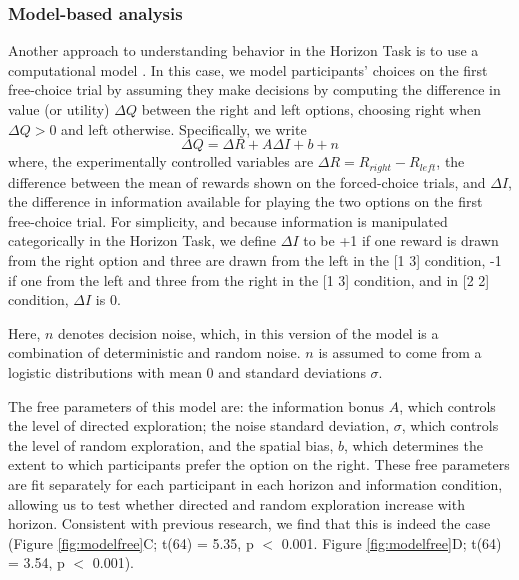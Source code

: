 \documentclass[12pt]{article}
\begin{document}
{	\subsubsection*{Model-based analysis}	
	Another approach to understanding behavior in the Horizon Task is to use a computational model \citep{wilson2014}. In this case, we model  participants' choices on the first free-choice trial by assuming they make decisions by computing the difference in value (or utility) $\Delta Q$ between the right and left options, choosing right when $\Delta Q > 0$ and left otherwise.  Specifically, we write
	\begin{equation}
		\label{eq:origmodel}
		\Delta Q= \Delta R+A \Delta I+b+n
	\end{equation}
	where, the experimentally controlled variables are $\Delta R=R_{right}-R_{left}$, the difference between the mean of rewards shown on the forced-choice trials, and $\Delta I$, the difference in information available for playing the two options on the first free-choice trial. For simplicity, and because information is manipulated categorically in the Horizon Task, we define $\Delta I$ to be +1 if one reward is drawn from the right option and three are drawn from the left in the [1 3] condition, -1 if one from the left and three from the right in the [1 3] condition, and in [2 2] condition, $\Delta I$ is 0. 
	
	Here, $n$ denotes decision noise, which, in this version of the model is a combination of deterministic and random noise. $n$ is assumed to come from a logistic distributions with mean 0 and standard deviations $\sigma$.
	
	The free parameters of this model are: the information bonus $A$, which controls the level of directed exploration; the noise standard deviation, $\sigma$, which controls the level of random exploration, and the spatial bias, $b$, which determines the extent to which participants prefer the option on the right. These free parameters are fit separately for each participant in each horizon and information condition, allowing us to test whether directed and random exploration increase with horizon. Consistent with previous research, we find that this is indeed the case (Figure \ref{fig:modelfree}C; t(64) = 5.35, p $<$ 0.001. Figure \ref{fig:modelfree}D; t(64) = 3.54, p $<$ 0.001). 
	
}
\end{document}
